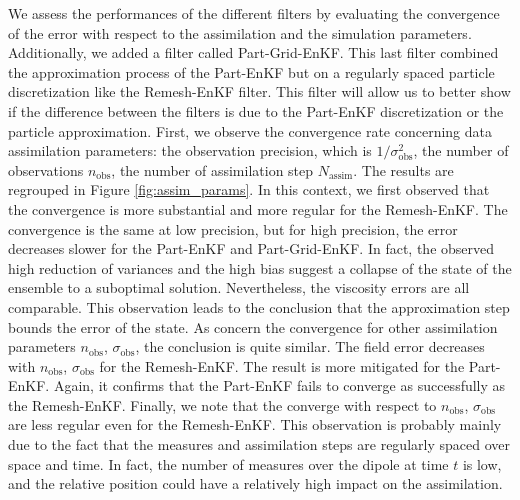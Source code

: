 We assess the performances of the different filters by evaluating the convergence of the error with respect to the assimilation and the simulation parameters. Additionally, we added a filter called Part-Grid-EnKF. This last filter combined the approximation process of the Part-EnKF but on a regularly spaced particle discretization like the Remesh-EnKF filter. This filter will allow us to better show if the difference between the filters is due to the Part-EnKF discretization or the particle approximation.
First, we observe the convergence rate concerning data assimilation parameters: the observation precision, which is \(1/\sigma_{\text{obs}}^2\), the number of observations \(n_{\text{obs}}\), the number of assimilation step \(N_{\text{assim}}\). The results are regrouped in Figure \ref{fig:assim_params}.
In this context, we first observed that the convergence is more substantial and more regular for the Remesh-EnKF. The convergence is the same at low precision, but for high precision, the error decreases slower for the Part-EnKF and Part-Grid-EnKF. In fact, the observed high reduction of variances and the high bias suggest a collapse of the state of the ensemble to a suboptimal solution. Nevertheless, the viscosity errors are all comparable. This observation leads to the conclusion that the approximation step bounds the error of the state.
As concern the convergence for other assimilation parameters \(n_{\text{obs}}\), \(\sigma_{\text{obs}}\), the conclusion is quite similar. The field error decreases with \(n_{\text{obs}}\), \(\sigma_{\text{obs}}\) for the Remesh-EnKF. The result is more mitigated for the Part-EnKF. Again, it confirms that the Part-EnKF fails to converge as successfully as the Remesh-EnKF.
Finally, we note that the converge with respect to \(n_{\text{obs}}\), \(\sigma_{\text{obs}}\) are less regular even for the Remesh-EnKF. This observation is probably mainly due to the fact that the measures and assimilation steps are regularly spaced over space and time. In fact, the number of measures over the dipole at time $t$ is low, and the relative position could have a relatively high impact on the assimilation.

